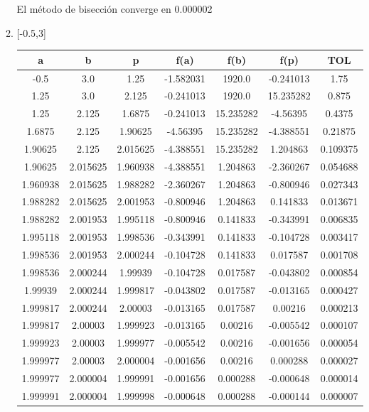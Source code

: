 \documentclass[12pt]{article}
\begin{document}
\begin{enumerate}
\begin{enumerate}[label=\alph*]
        El método de bisección converge en 0.000002
        \item {[-0.5,3]}\\
        \begin{tabular}{|c|c|c|c|c|c|c|}
            \hline
            \textbf{a} & \textbf{b} & \textbf{p} & \textbf{f(a)} & \textbf{f(b)} & \textbf{f(p)} & \textbf{TOL}\\ \hline
            -0.5 & 3.0 & 1.25 & -1.582031 & 1920.0 & -0.241013 & 1.75 \\
            1.25 & 3.0 & 2.125 & -0.241013 & 1920.0 & 15.235282 & 0.875 \\
            1.25 & 2.125 & 1.6875 & -0.241013 & 15.235282 & -4.56395 & 0.4375 \\
            1.6875 & 2.125 & 1.90625 & -4.56395 & 15.235282 & -4.388551 & 0.21875 \\
            1.90625 & 2.125 & 2.015625 & -4.388551 & 15.235282 & 1.204863 & 0.109375 \\
            1.90625 & 2.015625 & 1.960938 & -4.388551 & 1.204863 & -2.360267 & 0.054688 \\
            1.960938 & 2.015625 & 1.988282 & -2.360267 & 1.204863 & -0.800946 & 0.027343 \\
            1.988282 & 2.015625 & 2.001953 & -0.800946 & 1.204863 & 0.141833 & 0.013671 \\
            1.988282 & 2.001953 & 1.995118 & -0.800946 & 0.141833 & -0.343991 & 0.006835 \\
            1.995118 & 2.001953 & 1.998536 & -0.343991 & 0.141833 & -0.104728 & 0.003417 \\
            1.998536 & 2.001953 & 2.000244 & -0.104728 & 0.141833 & 0.017587 & 0.001708 \\
            1.998536 & 2.000244 & 1.99939 & -0.104728 & 0.017587 & -0.043802 & 0.000854 \\
            1.99939 & 2.000244 & 1.999817 & -0.043802 & 0.017587 & -0.013165 & 0.000427 \\
            1.999817 & 2.000244 & 2.00003 & -0.013165 & 0.017587 & 0.00216 & 0.000213 \\
            1.999817 & 2.00003 & 1.999923 & -0.013165 & 0.00216 & -0.005542 & 0.000107 \\
            1.999923 & 2.00003 & 1.999977 & -0.005542 & 0.00216 & -0.001656 & 0.000054 \\
            1.999977 & 2.00003 & 2.000004 & -0.001656 & 0.00216 & 0.000288 & 0.000027 \\
            1.999977 & 2.000004 & 1.999991 & -0.001656 & 0.000288 & -0.000648 & 0.000014 \\
            1.999991 & 2.000004 & 1.999998 & -0.000648 & 0.000288 & -0.000144 & 0.000007 \\
            \hline
        \end{tabular}


\end{enumerate}
\end{enumerate}
\end{document}
